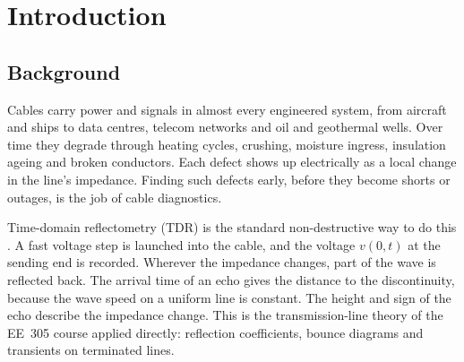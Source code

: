 \section{Introduction}
\label{sec:intro}

\subsection{Background}
Cables carry power and signals in almost every engineered system, from aircraft and ships to data centres, telecom networks and oil and geothermal wells. Over time they degrade through heating cycles, crushing, moisture ingress, insulation ageing and broken conductors. Each defect shows up electrically as a local change in the line's impedance. Finding such defects early, before they become shorts or outages, is the job of cable diagnostics.

Time-domain reflectometry (TDR) is the standard non-destructive way to do this \cite{pozar2011microwave,ulaby2015fundamentals}. A fast voltage step is launched into the cable, and the voltage $v(0,t)$ at the sending end is recorded. Wherever the impedance changes, part of the wave is reflected back. The arrival time of an echo gives the distance to the discontinuity, because the wave speed on a uniform line is constant. The height and sign of the echo describe the impedance change. This is the transmission-line theory of the EE~305 course applied directly: reflection coefficients, bounce diagrams and transients on terminated lines.

